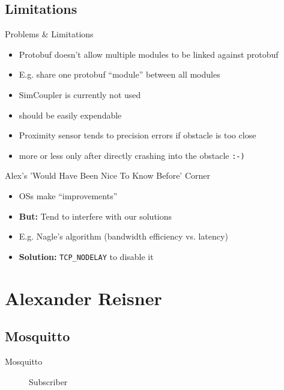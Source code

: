 \documentclass[aspectratio=169]{beamer}
\begin{document}
\subsection{Limitations}
\begin{frame}{Problems \& Limitations}
  \begin{itemize}
    \item Protobuf doesn't allow multiple modules to be linked against protobuf
    \item<2->[$\rightarrow$] E.g. share one protobuf ``module'' between all modules
    \item<3-> SimCoupler is currently not used
    \item<4->[$\rightarrow$] should be easily expendable
    \item<5-> Proximity sensor tends to precision errors if obstacle is too close
    \item<6->[$\rightarrow$] more or less only after directly crashing into the obstacle \tt :-)
  \end{itemize}
\end{frame}

\begin{frame}[fragile]{Alex's 'Would Have Been Nice To Know Before' Corner}
  \begin{itemize}
    \item OSs make ``improvements''
    \item \textbf{But:} Tend to interfere with our solutions
    \item E.g. Nagle's algorithm (bandwidth efficiency vs. latency)
    \item \textbf{Solution:} \texttt{TCP_NODELAY} to disable it
  \end{itemize}
\end{frame}

  \section{Alexander Reisner}

  \subsection{Mosquitto}
  \begin{frame}{Mosquitto}
        \begin{figure}
        \caption{\tiny Subscriber}
      \end{figure}
  \end{frame}
\end{document}
